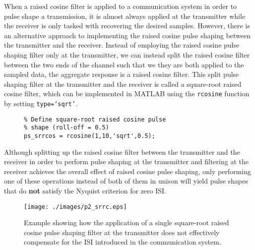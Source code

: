 \documentclass[letterpaper,12pt]{article}
\begin{document}
When a raised cosine filter is applied to a communication system in order to pulse shape a transmission, it is almost always applied at the transmitter while the receiver is only tasked with recovering the desired
samples. However, there is an alternative approach to implementing the raised cosine pulse shaping between the transmitter and the receiver.  Instead of employing the raised cosine pulse shaping filter only at the transmitter,
we can instead split the raised cosine filter between the two ends of the channel such that we they are both applied to the sampled data, the aggregate response is a raised cosine filter.  This split pulse shaping filter at the 
transmitter and the receiver is called a square-root raised cosine filter, which can be implemented in MATLAB using the \texttt{rcosine} function by setting \texttt{type=`sqrt'}.
\begin{figure}[h]
\centering
\begin{minipage}[framed]{0.9\textwidth}
\begin{lstlisting}
% Define square-root raised cosine pulse
% shape (roll-off = 0.5)
ps_srrcos = rcosine(1,10,'sqrt',0.5);
\end{lstlisting}
\end{minipage}
\captionsetup{labelformat=empty}
\end{figure}

Although splitting up the raised cosine filter between the transmitter and the receiver in order to perform pulse shaping at the transmitter and filtering at the receiver achieves the overall effect of raised cosine
pulse shaping, only performing one of these operations instead of both of them in unison will yield pulse shapes that do \textbf{not} satisfy the Nyquist criterion for zero ISI.




\begin{figure}[h]
 \centering
 \texttt{[image: ./images/p2\_srrc.eps]}
 \caption{Example showing how the application of a single square-root raised cosine pulse shaping filter at the transmitter does not effectively compensate for the ISI introduced in the communication system.}\label{f:p2_srrc}
\end{figure}
\end{document}
